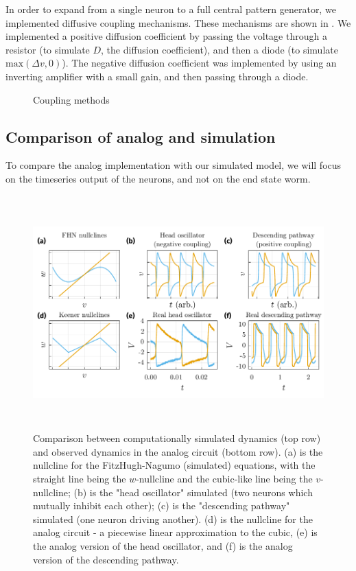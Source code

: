 \documentclass[
    11pt,
]{article}
\begin{document}
 In order to expand from a single neuron to a full central pattern generator, we implemented diffusive coupling mechanisms.  These mechanisms are shown in .  We implemented a positive diffusion coefficient by passing the voltage through a resistor (to simulate $D$, the diffusion coefficient), and then a diode (to simulate $\mathrm{max}(\Delta v, 0)$).  The negative diffusion coefficient was implemented by using an inverting amplifier with a small gain, and then passing through a diode.
\newsavebox{\tempbox}
\begin{figure}
    \centering
    \caption{Coupling methods}
    \label{fig: coupling}
\end{figure}

\subsection{Comparison of analog and simulation}

To compare the analog implementation with our simulated model, we will focus on the timeseries output of the neurons, and not on the end state worm.

\begin{figure}[h!]
    \centering
    \pgfplotsset{}
    \includegraphics[height=9cm]{figures/anal_sim_comp/anal_sim_comp.pdf}
    \caption{Comparison between computationally simulated dynamics (top row) and observed dynamics in the analog circuit (bottom row).  (a) is the nullcline for the FitzHugh-Nagumo (simulated) equations, with the straight line being the $w$-nullcline and the cubic-like line being the $v$-nullcline; (b) is the "head oscillator" simulated (two neurons which mutually inhibit each other); (c) is the "descending pathway" simulated (one neuron driving another).  (d) is the nullcline for the analog circuit - a piecewise linear approximation to the cubic, (e) is the analog version of the head oscillator, and (f) is the analog version of the descending pathway.}
    \label{fig: anal_sim_comp}
\end{figure}
\end{document}

